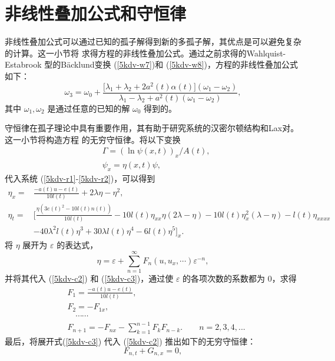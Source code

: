 \section{非线性叠加公式和守恒律}
非线性叠加公式可以通过已知的孤子解得到新的多孤子解，其优点是可以避免复杂的计算。这一小节将
求得方程的非线性叠加公式。通过之前求得的Wahlquist-Estabrook 型的B\"{a}cklund变换 (\ref{5kdv-w7})和 (\ref{5kdv-w8})，方程的非线性叠加公式如下：
\begin{equation}
\omega_3=\omega_0+\frac{\big[\lambda_1+\lambda_2+2 a^2(t) \alpha(t)\big](\omega_1-\omega_2)}
{\lambda_1-\lambda_2+a^2(t)(\omega_1-\omega_2)},\label{5kdv-lp11}
\end{equation}
其中 $\omega_1, \omega_2 $ 是通过任意的已知的解 $\omega_0$ 得到的。

守恒律在孤子理论中具有重要作用，其有助于研究系统的汉密尔顿结构和Lax对。这一小节将构造方程
的无穷守恒律。将以下变换
\begin{align}
&\Gamma=(\ln{\psi(x,t)})_x/A(t),\\
&\psi_x=\eta(x,t)\psi ,
\end{align}
代入系统 (\ref{5kdv-r1}-\ref{5kdv-r2})，可以得到
\begin{align}
\eta_x= & \frac{-a(t) u-e(t)}{10 l(t)}+2 \lambda \eta - \eta ^2,\label{c1} \\ \nonumber
\eta_t= & \big[\frac{\eta (3 e(t)^2-10 l(t) n(t))}{10 l(t)}-10 l(t) \eta_{xx} \eta  (2 \lambda -\eta)-10 l(t) \eta_x ^2 (\lambda -\eta)-l(t) \eta_{xxxx}\\
 & -40 \lambda ^2 l(t) \eta^3  +30 \lambda  l(t) \eta ^4-6 l(t) \eta^5\big]_x.\label{5kdv-c2}
\end{align}
将 $\eta$ 展开为 $\varepsilon$ 的表达式，
\begin{equation}
\eta=\varepsilon + \sum^\infty_{n=1} F_n(u,u_x,\cdots)\varepsilon^{-n},\label{5kdv-c3}
\end{equation}
并将其代入 (\ref{5kdv-c2}) 和 (\ref{5kdv-c3})，通过使 $\varepsilon$ 的各项次数的系数都为 $0$，求得
\begin{align}
& F_1=\frac{-a(t) u-e(t)}{10 l(t)}, \\
& F_2=-F_{1x},\\ \nonumber
& \quad \cdots\cdots \\
&  F_{n+1}=-F_{nx}- \sum^{n-1}_{k=1} F_k F_{n-k} . \quad\quad n=2,3,4,...
\end{align}
最后，将展开式(\ref{5kdv-c3}) 代入 (\ref{5kdv-c2}) 推出如下的无穷守恒律：
\begin{equation}
F_{n,t}+G_{n,x}=0,
\end{equation}

